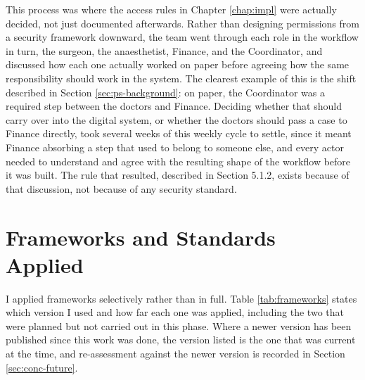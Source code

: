 This process was where the access rules in Chapter \ref{chap:impl} were actually decided, not just documented afterwards. Rather than designing permissions from a security framework downward, the team went through each role in the workflow in turn, the surgeon, the anaesthetist, Finance, and the Coordinator, and discussed how each one actually worked on paper before agreeing how the same responsibility should work in the system. The clearest example of this is the shift described in Section \ref{sec:ps-background}: on paper, the Coordinator was a required step between the doctors and Finance. Deciding whether that should carry over into the digital system, or whether the doctors should pass a case to Finance directly, took several weeks of this weekly cycle to settle, since it meant Finance absorbing a step that used to belong to someone else, and every actor needed to understand and agree with the resulting shape of the workflow before it was built. The rule that resulted, described in Section 5.1.2, exists because of that discussion, not because of any security standard.

\section{Frameworks and Standards Applied}
\label{sec:met-frameworks}

I applied frameworks selectively rather than in full. Table \ref{tab:frameworks} states which version I used and how far each one was applied, including the two that were planned but not carried out in this phase. Where a newer version has been published since this work was done, the version listed is the one that was current at the time, and re-assessment against the newer version is recorded in Section \ref{sec:conc-future}.

